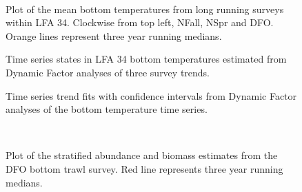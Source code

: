 \documentclass[11pt]{article}
\newcommand{\e}{/SpinDr/backup/bio_data/bio.lobster/figures/LFA3438Framework2019/} %
\begin{document}
    
\begin{figure}
        \centering
    \\
        
         \caption{Plot of the mean bottom temperatures from long running surveys within LFA 34. Clockwise from top left, NFall, NSpr and DFO.
         Orange lines represent three year running medians.}
        \end{figure}


   \begin{figure}
    \centering
        \caption{Time series states in LFA 34 bottom temperatures estimated from Dynamic Factor analyses of three survey trends.}

    \end{figure}

\begin{figure}
    \centering
        \caption{Time series trend fits with confidence intervals from Dynamic Factor analyses of the bottom temperature time series.}

    \end{figure}

\begin{figure}
        \centering
    \\
                
        
         \caption{Plot of the stratified abundance and biomass estimates from the DFO bottom trawl survey. Red line represents three year running medians.}
        \end{figure}
\end{document}
